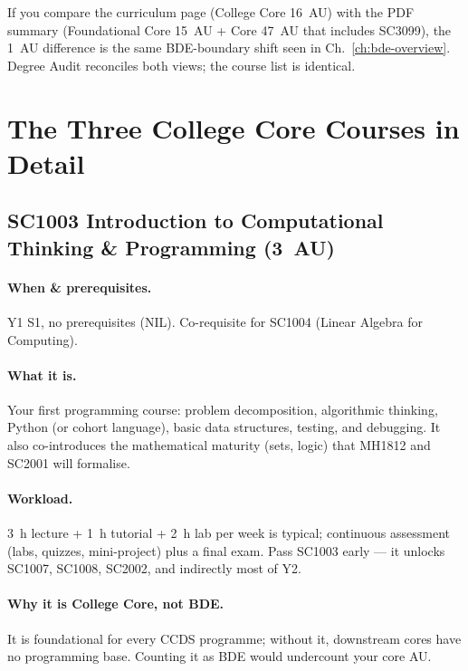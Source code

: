 \begin{remark}
If you compare the curriculum page (College Core 16~AU) with the PDF summary (Foundational Core 15~AU + Core 47~AU that includes SC3099), the 1~AU difference is the same BDE-boundary shift seen in Ch.~\ref{ch:bde-overview}. Degree Audit reconciles both views; the course list is identical.
\end{remark}

\section{The Three College Core Courses in Detail}
\label{sec:college-courses}

\subsection{SC1003 Introduction to Computational Thinking \& Programming (3~AU)}
\paragraph{When \& prerequisites.} Y1 S1, no prerequisites (NIL). Co-requisite for SC1004 (Linear Algebra for Computing).

\paragraph{What it is.} Your first programming course: problem decomposition, algorithmic thinking, Python (or cohort language), basic data structures, testing, and debugging. It also co-introduces the mathematical maturity (sets, logic) that MH1812 and SC2001 will formalise.

\paragraph{Workload.} 3~h lecture + 1~h tutorial + 2~h lab per week is typical; continuous assessment (labs, quizzes, mini-project) plus a final exam. Pass SC1003 early --- it unlocks SC1007, SC1008, SC2002, and indirectly most of Y2.

\paragraph{Why it is College Core, not BDE.} It is foundational for every CCDS programme; without it, downstream cores have no programming base. Counting it as BDE would undercount your core AU.

